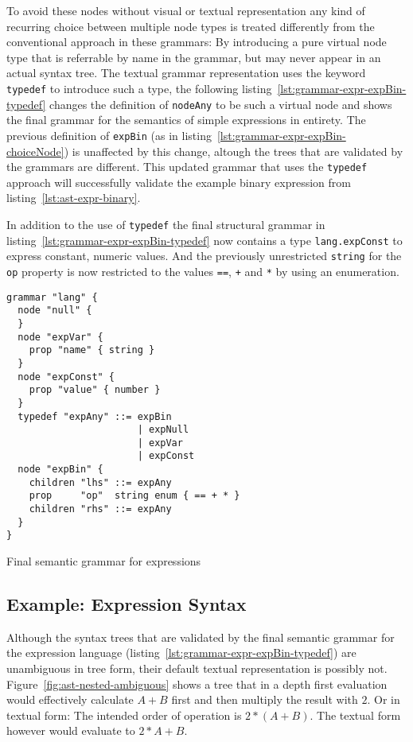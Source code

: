 \documentclass[sigconf,natbib=false,review=true,anonymous]{acmart}
\begin{document}
To avoid these nodes without visual or textual representation any kind of recurring choice between multiple node types is treated differently from the conventional approach in these grammars: By introducing a pure virtual node type that is referrable by name in the grammar, but may never appear in an actual syntax tree. The textual grammar representation uses the keyword \texttt{typedef} to introduce such a type, the following listing~\ref{lst:grammar-expr-expBin-typedef} changes the definition of \texttt{nodeAny} to be such a virtual node and shows the final grammar for the semantics of simple expressions in entirety. The previous definition of \texttt{expBin} (as in listing~\ref{lst:grammar-expr-expBin-choiceNode}) is unaffected by this change, altough the trees that are validated by the grammars are different. This updated grammar that uses the \texttt{typedef} approach will successfully validate the example binary expression from listing~\ref{lst:ast-expr-binary}.

In addition to the use of \texttt{typedef} the final structural grammar in listing~\ref{lst:grammar-expr-expBin-typedef} now contains a type \texttt{lang.expConst} to express constant, numeric values. And the previously unrestricted \texttt{string} for the \texttt{op} property is now restricted to the values \texttt{==}, \texttt{+} and \texttt{*} by using an enumeration.

\begin{listing}[H]
\begin{verbatim}
grammar "lang" {
  node "null" {
  }
  node "expVar" {
    prop "name" { string }
  }
  node "expConst" {
    prop "value" { number }
  }
  typedef "expAny" ::= expBin
                       | expNull
                       | expVar
                       | expConst
  node "expBin" {
    children "lhs" ::= expAny
    prop     "op"  string enum { == + * }
    children "rhs" ::= expAny
  }
}
\end{verbatim}

\caption{Final semantic grammar for expressions}
\label{lst:grammar-expr-expBin-typedef}
\end{listing}

\subsection{Example: Expression Syntax}

Although the syntax trees that are validated by the final semantic grammar for the expression language (listing~\ref{lst:grammar-expr-expBin-typedef}) are unambiguous in tree form, their default textual representation is possibly not. Figure~\ref{fig:ast-nested-ambiguous} shows a tree that in a depth first evaluation would effectively calculate $A+B$ first and then multiply the result with $2$. Or in textual form: The intended order of operation is $2 * (A+B)$. The textual form however would evaluate to $2 * A + B$.
\end{document}
